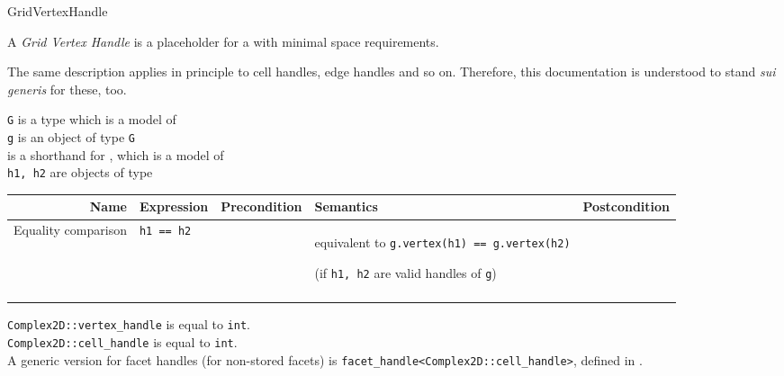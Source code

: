 \begin{Label}{GridVertexHandle}
\end{Label}


A {\em Grid Vertex Handle\/} is a placeholder for a 
with minimal space requirements.

The same description applies in principle to cell handles, edge handles and so on.
Therefore, this documentation is understood to stand {\em sui generis\/} for these, too.


\W{}
{\tt G} is a type which is a model of 
\\
{\tt g} is an object of type  {\tt G}
\\
 is a shorthand for , which is a model 
of 
\\
{\tt h1, h2} are objects of type 

\W{}

\W{}

\begin{tabularx}{15cm}{Rllp{5cm}R} \\ 
  \hline 
  \bf  Name     &
  \bf  Expression &
  \bf  Precondition&
  \bf  Semantics &
  \bf  Postcondition
  \\ 
  \hline
  Equality comparison & 
  {\tt h1 == h2} &
  ~ &
  equivalent to  {\tt g.vertex(h1) == g.vertex(h2)}
  \par (if  {\tt h1, h2}
  are valid handles of {\tt g}) &
  ~  
  \\ 
  \hline
  \\
\end{tabularx}


{\tt Complex2D::vertex\_handle} is equal to {\tt int}.
\\
{\tt Complex2D::cell\_handle} is equal to {\tt int}.
\\
A generic version for facet handles 
(for non-stored facets)
is {\tt facet\_handle<Complex2D::cell\_handle>},
defined in .

 ~
 ~
 ~
 ~
 ~

  

